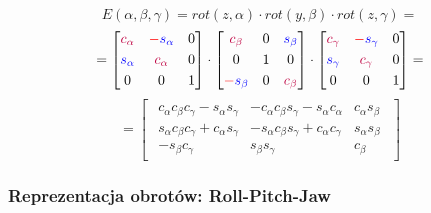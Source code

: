 \documentclass{article}
\begin{document}
\Large
$$
    E\left(\alpha, \beta, \gamma\right)=rot\left(z, \alpha\right) \cdot rot\left(y, \beta\right) \cdot rot\left(z, \gamma\right) =
$$
$$
    =
    \begin{bmatrix}
        {\color{purple} c_{\alpha}} & {\color{red}-}{\color{blue} s_{\alpha}} & 0 \\[0.3em]
        {\color{blue} s_{\alpha}}   & {\color{purple} c_{\alpha}}             & 0 \\[0.3em]
        0                           & 0                                       & 1
    \end{bmatrix}
    \cdot
    \begin{bmatrix}
        {\color{purple} c_{\beta}}             & 0 & {\color{blue} s_{\beta}}   \\[0.3em]
        0                                      & 1 & 0                          \\[0.3em]
        {\color{red}-}{\color{blue} s_{\beta}} & 0 & {\color{purple} c_{\beta}}
    \end{bmatrix}
    \cdot
    \begin{bmatrix}
        {\color{purple} c_{\gamma}} & {\color{red}-}{\color{blue} s_{\gamma}} & 0 \\[0.3em]
        {\color{blue} s_{\gamma}}   & {\color{purple} c_{\gamma}}             & 0 \\[0.3em]
        0                           & 0                                       & 1
    \end{bmatrix}
    =
$$
$$
    =
    \begin{bmatrix}
        \begin{array}{c|c|c}
            c_{\alpha}c_{\beta}c_{\gamma}-s_{\alpha}s_{\gamma} & -c_{\alpha}c_{\beta}s_{\gamma}-s_{\alpha}c_{\alpha} & c_{\alpha}s_{\beta} \\[0.3em]
            \hline
            s_{\alpha}c_{\beta}c_{\gamma}+c_{\alpha}s_{\gamma} & -s_{\alpha}c_{\beta}s_{\gamma}+c_{\alpha}c_{\gamma} & s_{\alpha}s_{\beta} \\[0.3em]
            \hline
            -s_{\beta}c_{\gamma}                               & s_{\beta}s_{\gamma}                                 & c_{\beta}
        \end{array}
    \end{bmatrix}
$$
\normalsize

\newpage

\subsubsection{Reprezentacja obrotów: Roll-Pitch-Jaw}
\end{document}
